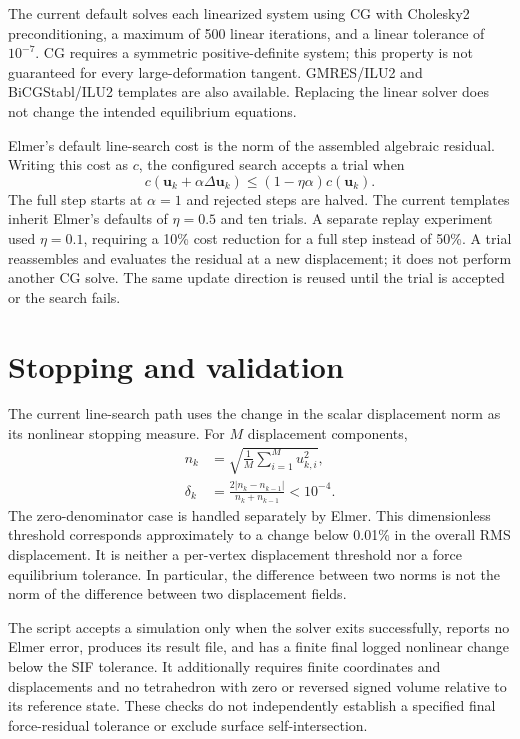 \documentclass[11pt]{article}
\newcommand{\vect}[1]{\boldsymbol{#1}}
\begin{document}
The current default solves each linearized system using CG with Cholesky2
preconditioning, a maximum of 500 linear iterations, and a linear tolerance of
$10^{-7}$. CG requires a symmetric positive-definite system; this property is
not guaranteed for every large-deformation tangent. GMRES/ILU2 and
BiCGStabl/ILU2 templates are also available. Replacing the linear solver does
not change the intended equilibrium equations.

Elmer's default line-search cost is the norm of the assembled algebraic residual.
Writing this cost as $c$, the configured search accepts a trial when
\begin{equation}
 c(\vect{u}_k+\alpha\Delta\vect{u}_k)
 \leq (1-\eta\alpha)c(\vect{u}_k).
 \label{eq:armijo}
\end{equation}
The full step starts at $\alpha=1$ and rejected steps are halved. The current
templates inherit Elmer's defaults of $\eta=0.5$ and ten trials. A separate replay
experiment used $\eta=0.1$, requiring a 10\% cost reduction for a full step instead
of 50\%. A trial reassembles and evaluates the residual at a new displacement;
it does not perform another CG solve. The same update direction is reused until
the trial is accepted or the search fails.

\section{Stopping and validation}
The current line-search path uses the change in the scalar displacement norm as
its nonlinear stopping measure. For $M$ displacement components,
\begin{align}
 n_k&=\sqrt{\frac{1}{M}\sum_{i=1}^{M}u_{k,i}^2},\\
 \delta_k&=\frac{2|n_k-n_{k-1}|}{n_k+n_{k-1}}<10^{-4}.
 \label{eq:stop}
\end{align}
The zero-denominator case is handled separately by Elmer. This dimensionless
threshold corresponds approximately to a change below 0.01\% in the overall
RMS displacement. It is neither a per-vertex displacement threshold nor a force
equilibrium tolerance. In particular, the difference between two norms is not
the norm of the difference between two displacement fields.

The script accepts a simulation only when the solver exits successfully,
reports no Elmer error, produces its result file, and has a finite final logged
nonlinear change below the SIF tolerance. It additionally requires finite
coordinates and displacements and no tetrahedron with zero or reversed signed
volume relative to its reference state. These checks do not independently
establish a specified final force-residual tolerance or exclude surface
self-intersection.
\end{document}
